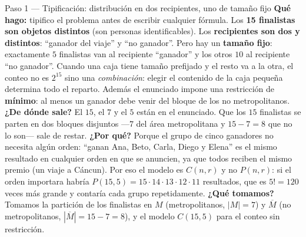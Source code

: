 \documentclass[11pt]{article}
\begin{document}
\begin{sol}

\begin{paso}{Paso 1 --- Tipificación: distribución en dos recipientes, uno de tamaño fijo}
\textbf{Qué hago:} tipifico el problema antes de escribir cualquier fórmula. Los \textbf{15 finalistas son objetos distintos} (son personas identificables). Los \textbf{recipientes son dos y distintos}: ``ganador del viaje'' y ``no ganador''. Pero hay un \textbf{tamaño fijo}: exactamente $5$ finalistas van al recipiente ``ganador'' y los otros $10$ al recipiente ``no ganador''. Cuando una caja tiene tamaño prefijado y el resto va a la otra, el conteo no es $2^{15}$ sino una \emph{combinación}: elegir el contenido de la caja pequeña determina todo el reparto. Además el enunciado impone una restricción de \textbf{mínimo}: al menos un ganador debe venir del bloque de los no metropolitanos.
\textbf{¿De dónde sale?} El $15$, el $7$ y el $5$ están en el enunciado. Que los $15$ finalistas se parten en dos bloques disjuntos —$7$ del área metropolitana y $15-7=8$ que no lo son— sale de restar.
\textbf{¿Por qué?} Porque el grupo de cinco ganadores no necesita algún orden: ``ganan Ana, Beto, Carla, Diego y Elena'' es el mismo resultado en cualquier orden en que se anuncien, ya que todos reciben el mismo premio (un viaje a Cáncun). Por eso el modelo es $C(n,r)$ y no $P(n,r)$: si el orden importara habría $P(15,5)=15\cdot14\cdot13\cdot12\cdot11$ resultados, que es $5!=120$ veces más grande y contaría cada grupo repetidamente.
\textbf{¿Qué tomamos?} Tomamos la partición de los finalistas en $M$ (metropolitanos, $|M|=7$) y $\overline{M}$ (no metropolitanos, $|\overline{M}|=15-7=8$), y el modelo $C(15,5)$ para el conteo sin restricción.
\end{paso}


\end{sol}
\end{document}
